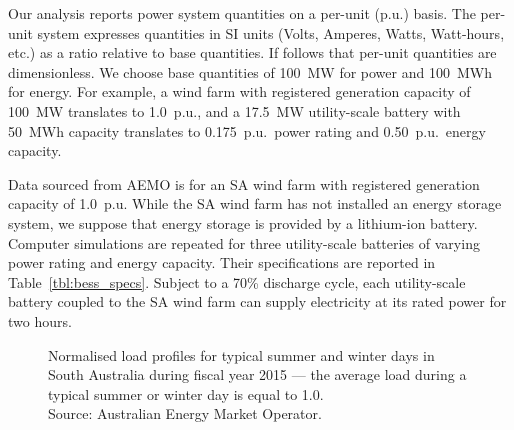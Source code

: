 Our analysis reports power system quantities on a per-unit (p.u.) basis.  The per-unit system expresses quantities in SI units (Volts, Amperes, Watts, Watt-hours, etc.) as a ratio relative to base quantities.  If follows that per-unit quantities are dimensionless.  We choose base quantities of 100~MW for power and 100~MWh for energy.  For example, a wind farm with registered generation capacity of 100~MW translates to 1.0~p.u., and a 17.5~MW utility-scale battery with 50~MWh capacity translates to 0.175~p.u.\ power rating and 0.50~p.u.\ energy capacity.

Data sourced from AEMO \citeyearpar{AEMO16} is for an SA wind farm with registered generation capacity of 1.0~p.u.  While the SA wind farm has not installed an energy storage system, we suppose that energy storage is provided by a lithium-ion battery.  Computer simulations are repeated for three utility-scale batteries of varying power rating and energy capacity.  Their specifications are reported in Table~\ref{tbl:bess_specs}.  Subject to a 70\% discharge cycle, each utility-scale battery coupled to the SA wind farm can supply electricity at its rated power for two hours.

\begin{figure}[!b]
	\centering
	\caption[Normalised load profiles for typical summer and winter days]{Normalised load profiles for typical summer and winter days in South Australia during fiscal year 2015 --- the average load during a typical summer or winter day is equal to 1.0.	\protect\\
		{\footnotesize Source: Australian Energy Market Operator.}} 
	\label{fig:load_prof_norm}
\end{figure}

